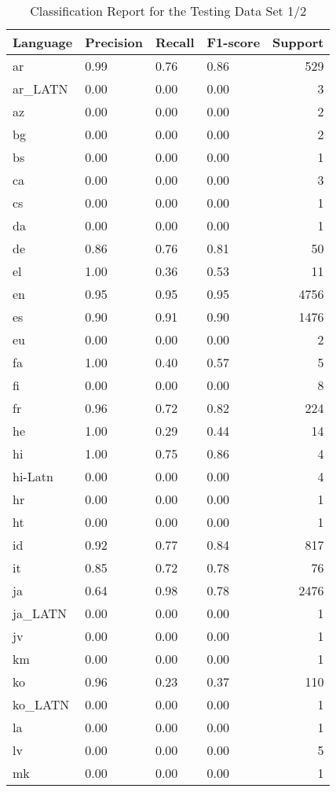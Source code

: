 \documentclass[fleqn,10pt]{SelfArx} %
\begin{document}
\begin{table*}[hbt]
	\caption{Classification Report for the Testing Data Set 1/2}
	\centering
	\begin{tabular}{llllr}
	\toprule
	Language & Precision & Recall  & F1-score & Support \\
	\midrule
	ar & 0.99 & 0.76 & 0.86 & 529\\
	ar\_LATN & 0.00 & 0.00 & 0.00 & 3\\
	az & 0.00 & 0.00 & 0.00 & 2\\
	bg & 0.00 & 0.00 & 0.00 & 2\\
	bs & 0.00 & 0.00 & 0.00 & 1\\
	ca & 0.00 & 0.00 & 0.00 & 3\\
	cs & 0.00 & 0.00 & 0.00 & 1\\
	da & 0.00 & 0.00 & 0.00 & 1\\
	de & 0.86 & 0.76 & 0.81 & 50\\
	el  & 1.00 & 0.36 & 0.53 & 11\\
	en & 0.95 & 0.95 & 0.95 & 4756\\
	es & 0.90 & 0.91 & 0.90 & 1476\\
	eu & 0.00 & 0.00 & 0.00 & 2\\
	fa & 1.00 & 0.40 & 0.57 & 5\\
	fi & 0.00 & 0.00 & 0.00 & 8\\
	fr & 0.96 & 0.72 & 0.82 & 224\\
	he & 1.00 & 0.29 & 0.44 & 14\\
	hi & 1.00 & 0.75 & 0.86 & 4\\
	hi-Latn & 0.00 & 0.00 & 0.00 & 4\\
	hr & 0.00 & 0.00 & 0.00 & 1\\
	ht & 0.00 & 0.00 & 0.00 & 1\\
	id & 0.92 & 0.77 & 0.84 & 817\\
	it & 0.85 & 0.72 & 0.78 & 76\\
	ja & 0.64 & 0.98 & 0.78 & 2476\\
	ja\_LATN & 0.00 & 0.00 & 0.00 & 1\\
	jv & 0.00 & 0.00 & 0.00 & 1\\
	km & 0.00 & 0.00 & 0.00 & 1\\
	ko  & 0.96 & 0.23 & 0.37 & 110\\
	ko\_LATN & 0.00 & 0.00 & 0.00 & 1\\
	la & 0.00 & 0.00 & 0.00 & 1\\
	lv & 0.00 & 0.00 & 0.00 & 5\\
	mk & 0.00 & 0.00 & 0.00 & 1\\

\end{tabular}
\end{table*}
\end{document}
